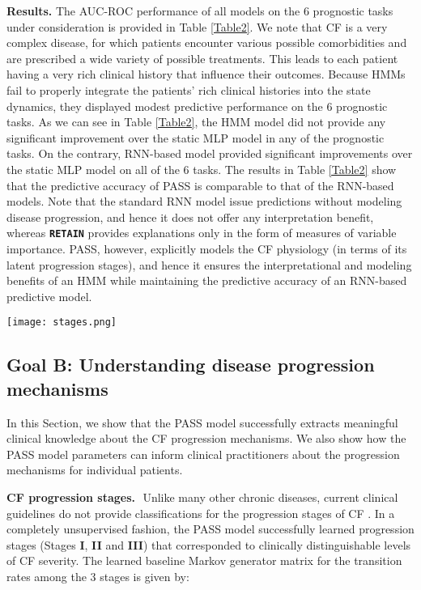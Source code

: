 \documentclass[twoside,11pt]{article}
\begin{document}
{\bf Results.} The AUC-ROC performance of all models on the 6 prognostic tasks under consideration is provided in Table \ref{Table2}. We note that CF is a very complex disease, for which patients encounter various possible comorbidities and are prescribed a wide variety of possible treatments. This leads to each patient having a very rich clinical history that influence their outcomes. Because HMMs fail to properly integrate the patients' rich clinical histories into the state dynamics, they displayed modest predictive performance on the 6 prognostic tasks. As we can see in Table \ref{Table2}, the HMM model did not provide any significant improvement over the static MLP model in any of the prognostic tasks. On the contrary, RNN-based model provided significant improvements over the static MLP model on all of the 6 tasks. The results in Table \ref{Table2} show that the predictive accuracy of PASS is comparable to that of the RNN-based models. Note that the standard RNN model issue predictions without modeling disease progression, and hence it does not offer any interpretation benefit, whereas \textbf{\texttt{RETAIN}} provides explanations only in the form of measures of variable importance. PASS, however, explicitly models the CF physiology (in terms of its latent progression stages), and hence it ensures the interpretational and modeling benefits of an HMM while maintaining the predictive accuracy of an RNN-based predictive model.

\begin{figure*}[t]
  \centering
  \texttt{[image: stages.png]}
	\label{Fig5}
\end{figure*}

\subsection{{\bf Goal B}: Understanding disease progression mechanisms}
\label{SSec52}

In this Section, we show that the PASS model successfully extracts meaningful clinical knowledge about the CF progression mechanisms. We also show how the PASS model parameters can inform clinical practitioners about the progression mechanisms for individual patients.  

{\bf CF progression stages.}\,\, Unlike many other chronic diseases, current clinical guidelines do not provide classifications for the progression stages of CF \cite{szczesniak2017phenotypes}. In a completely unsupervised fashion, the PASS model successfully learned \mbox{\footnotesize } progression stages (Stages {\bf I}, {\bf II} and {\bf III}) that corresponded to clinically distinguishable levels of CF severity. The learned baseline Markov generator matrix for the transition rates among the 3 stages is given by:
  
\end{document}
